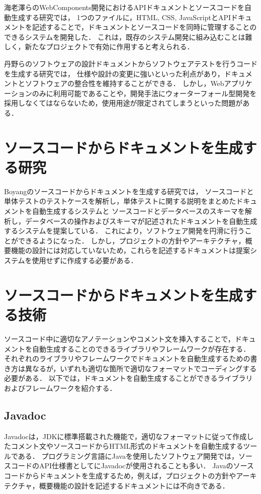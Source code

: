 海老澤らのWebComponents開発におけるAPIドキュメントとソースコードを自動生成する研究\cite{webcomponents}では，
1つのファイルに，HTML, CSS, JavaScriptとAPIドキュメントを記述することで，ドキュメントとソースコードを同時に管理することのできるシステムを開発した．
これは，既存のシステム開発に組み込むことは難しく，新たなプロジェクトで有効に作用すると考えられる．

丹野らのソフトウェアの設計ドキュメントからソフトウェアテストを行うコードを生成する研究\cite{test}では，
仕様や設計の変更に強いといった利点があり，ドキュメントとソフトウェアの整合性を維持することができる．
しかし，Webアプリケーションのみに利用可能であることや，開発手法にウォーターフォール型開発を採用しなくてはならないため，使用用途が限定されてしまうといった問題がある．

\section{ソースコードからドキュメントを生成する研究}
Boyangのソースコードからドキュメントを生成する研究\cite{automatically}では，
ソースコードと単体テストのテストケースを解析し，単体テストに関する説明をまとめたドキュメントを自動生成するシステムと
ソースコードとデータベースのスキーマを解析し，データベースの操作およびスキーマが記述されたドキュメントを自動生成するシステムを提案している．
これにより，ソフトウェア開発を円滑に行うことができるようになった．
しかし，プロジェクトの方針やアーキテクチャ，概要機能の設計には対応していないため，これらを記述するドキュメントは提案システムを使用せずに作成する必要がある．

\section{ソースコードからドキュメントを生成する技術}
ソースコード中に適切なアノテーションやコメント文を挿入することで，ドキュメントを自動生成することのできるライブラリやフレームワークが存在する．
それぞれのライブラリやフレームワークでドキュメントを自動生成するための書き方は異なるが，いずれも適切な箇所で適切なフォーマットでコーディングする必要がある．
以下では，ドキュメントを自動生成することができるライブラリおよびフレームワークを紹介する．

\subsection{Javadoc}
Javadoc\cite{javadoc}は，JDKに標準搭載された機能で，適切なフォーマットに従って作成したコメント文やソースコードからHTML形式のドキュメントを自動生成するツールである．
プログラミング言語にJavaを使用したソフトウェア開発では，ソースコードのAPI仕様書としてにJavadocが使用されることも多い．
Javaのソースコードからドキュメントを生成するため，例えば，プロジェクトの方針やアーキテクチャ，概要機能の設計を記述するドキュメントには不向きである．


